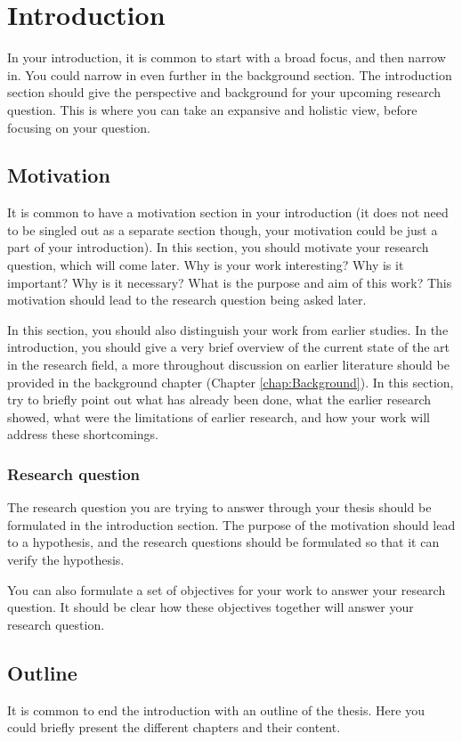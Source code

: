 \chapter{Introduction}
\label{chap:Introduction}

In your introduction, it is common to start with a broad focus, and then narrow in. You could narrow in even further in the background section. The introduction section should give the perspective and background for your upcoming research question. This is where you can take an expansive and holistic view, before focusing on your question.

\section{Motivation}

It is common to have a motivation section in your introduction (it does not need to be singled out as a separate section though, your motivation could be just a part of your introduction). In this section, you should motivate your research question, which will come later. Why is your work interesting? Why is it important? Why is it necessary? What is the purpose and aim of this work? This motivation should lead to the research question being asked later.

In this section, you should also distinguish your work from earlier studies. In the introduction, you should give a very brief overview of the current state of the art in the research field, a more throughout discussion on earlier literature should be provided in the background chapter (Chapter \ref{chap:Background}). In this section, try to briefly point out what has already been done, what the earlier research showed, what were the limitations of earlier research, and how your work will address these shortcomings.


\subsection{Research question}

The research question you are trying to answer through your thesis should be formulated in the introduction section. The purpose of the motivation should lead to a hypothesis, and the research questions should be formulated so that it can verify the hypothesis.

You can also formulate a set of objectives for your work to answer your research question.  It should be clear how these objectives together will answer your research question.

\section{Outline}

It is common to end the introduction with an outline of the thesis. Here you could briefly present the different chapters and their content.